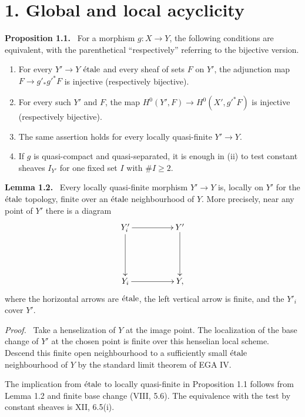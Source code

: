 \documentclass[12pt]{article}
\newcommand{\etale}{\ifmmode\textnormal{\'etale}\else\'etale\fi}
\newenvironment{statement}[1]{\par\medskip\noindent\textbf{#1.}\ }{\par\medskip}
\newenvironment{prooftext}[1][Proof]{\par\noindent\emph{#1.}\ }{\par\medskip}
\begin{document}
\section*{1. Global and local acyclicity}

\begin{statement}{Proposition 1.1}
For a morphism \(g:X\to Y\), the following conditions are equivalent, with the parenthetical ``respectively'' referring to the bijective version.
\begin{enumerate}[label=(\roman*)]
\item For every \(Y'\to Y\) \(\etale\) and every sheaf of sets \(F\) on \(Y'\), the adjunction map \(F\to g'_*g'^*F\) is injective (respectively bijective).
\item For every such \(Y'\) and \(F\), the map \(H^0(Y',F)\to H^0(X',g'^*F)\) is injective (respectively bijective).
\item The same assertion holds for every locally quasi-finite \(Y'\to Y\).
\item If \(g\) is quasi-compact and quasi-separated, it is enough in (ii) to test constant sheaves \(I_{Y'}\) for one fixed set \(I\) with \(\#I\ge2\).
\end{enumerate}
\end{statement}

\begin{statement}{Lemma 1.2}
Every locally quasi-finite morphism \(Y'\to Y\) is, locally on \(Y'\) for the \(\etale\) topology, finite over an \(\etale\) neighbourhood of \(Y\). More precisely, near any point of \(Y'\) there is a diagram
\[
\xymatrix@=1.75cm{
Y'_i\ar[r]\ar[d]&Y'\ar[d]\\
Y_i\ar[r]&Y,
}
\]
where the horizontal arrows are \(\etale\), the left vertical arrow is finite, and the \(Y'_i\) cover \(Y'\).
\end{statement}

\begin{prooftext}
Take a henselization of \(Y\) at the image point. The localization of the base change of \(Y'\) at the chosen point is finite over this henselian local scheme. Descend this finite open neighbourhood to a sufficiently small \(\etale\) neighbourhood of \(Y\) by the standard limit theorem of EGA IV.
\end{prooftext}

The implication from \(\etale\) to locally quasi-finite in Proposition 1.1 follows from Lemma 1.2 and finite base change (VIII, 5.6). The equivalence with the test by constant sheaves is XII, 6.5(i).
\end{document}
